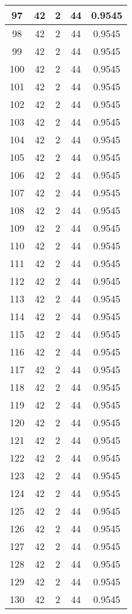 \documentclass[letterpaper, 12pt]{article}
\begin{document}
\begin{longtable}{|c|c|c|c|c|}
\hline
97 & 42 & 2 & 44 & 0.9545 \\
\hline
98 & 42 & 2 & 44 & 0.9545 \\
\hline
99 & 42 & 2 & 44 & 0.9545 \\
\hline
100 & 42 & 2 & 44 & 0.9545 \\
\hline
101 & 42 & 2 & 44 & 0.9545 \\
\hline
102 & 42 & 2 & 44 & 0.9545 \\
\hline
103 & 42 & 2 & 44 & 0.9545 \\
\hline
104 & 42 & 2 & 44 & 0.9545 \\
\hline
105 & 42 & 2 & 44 & 0.9545 \\
\hline
106 & 42 & 2 & 44 & 0.9545 \\
\hline
107 & 42 & 2 & 44 & 0.9545 \\
\hline
108 & 42 & 2 & 44 & 0.9545 \\
\hline
109 & 42 & 2 & 44 & 0.9545 \\
\hline
110 & 42 & 2 & 44 & 0.9545 \\
\hline
111 & 42 & 2 & 44 & 0.9545 \\
\hline
112 & 42 & 2 & 44 & 0.9545 \\
\hline
113 & 42 & 2 & 44 & 0.9545 \\
\hline
114 & 42 & 2 & 44 & 0.9545 \\
\hline
115 & 42 & 2 & 44 & 0.9545 \\
\hline
116 & 42 & 2 & 44 & 0.9545 \\
\hline
117 & 42 & 2 & 44 & 0.9545 \\
\hline
118 & 42 & 2 & 44 & 0.9545 \\
\hline
119 & 42 & 2 & 44 & 0.9545 \\
\hline
120 & 42 & 2 & 44 & 0.9545 \\
\hline
121 & 42 & 2 & 44 & 0.9545 \\
\hline
122 & 42 & 2 & 44 & 0.9545 \\
\hline
123 & 42 & 2 & 44 & 0.9545 \\
\hline
124 & 42 & 2 & 44 & 0.9545 \\
\hline
125 & 42 & 2 & 44 & 0.9545 \\
\hline
126 & 42 & 2 & 44 & 0.9545 \\
\hline
127 & 42 & 2 & 44 & 0.9545 \\
\hline
128 & 42 & 2 & 44 & 0.9545 \\
\hline
129 & 42 & 2 & 44 & 0.9545 \\
\hline
130 & 42 & 2 & 44 & 0.9545 \\

\end{longtable}
\end{document}
